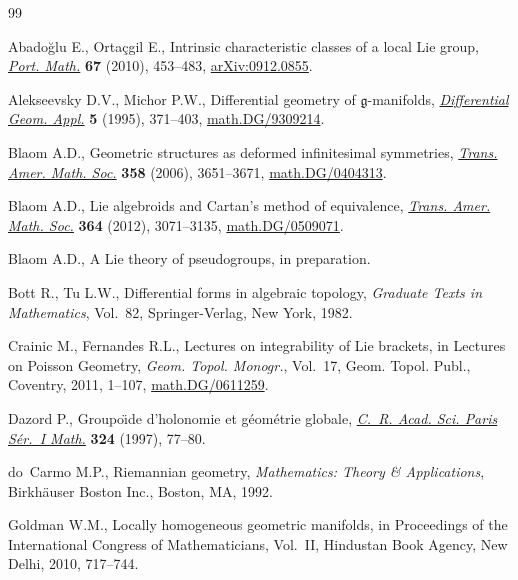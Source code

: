 \documentclass[pdftex]{sigma}
\numberwithin{equation}{section}
\begin{document}
\begin{thebibliography}{99}
\footnotesize\itemsep=-1pt

Abado{\u{g}}lu E., Orta{\c{c}}gil E., Intrinsic characteristic classes of a
  local {L}ie group, \href{http://dx.doi.org/10.4171/PM/1873}{\textit{Port. Math.}} \textbf{67} (2010), 453--483,
  \href{http://arxiv.org/abs/0912.0855}{arXiv:0912.0855}.

Alekseevsky D.V., Michor P.W., Dif\/ferential geometry of {$\mathfrak
  g$}-manifolds, \href{http://dx.doi.org/10.1016/0926-2245(95)00023-2}{\textit{Differential Geom. Appl.}} \textbf{5} (1995), 371--403,
  \href{http://arxiv.org/abs/math.DG/9309214}{math.DG/9309214}.

Blaom A.D., Geometric structures as deformed inf\/initesimal symmetries,
  \href{http://dx.doi.org/10.1090/S0002-9947-06-04057-8}{\textit{Trans. Amer. Math. Soc.}} \textbf{358} (2006), 3651--3671,
  \href{http://arxiv.org/abs/math.DG/0404313}{math.DG/0404313}.

Blaom A.D., Lie algebroids and {C}artan's method of equivalence, \href{http://dx.doi.org/10.1090/S0002-9947-2012-05441-9}{\textit{Trans.
  Amer. Math. Soc.}} \textbf{364} (2012), 3071--3135, \href{http://arxiv.org/abs/math.DG/0509071}{math.DG/0509071}.

Blaom A.D., A Lie theory of pseudogroups, {i}n preparation.

Bott R., Tu L.W., Dif\/ferential forms in algebraic topology, \textit{Graduate
  Texts in Mathematics}, Vol.~82, Springer-Verlag, New York, 1982.

Crainic M., Fernandes R.L., Lectures on integrability of {L}ie brackets, in
  Lectures on {P}oisson Geometry, \textit{Geom. Topol. Monogr.}, Vol.~17, Geom.
  Topol. Publ., Coventry, 2011, 1--107, \href{http://arxiv.org/abs/math.DG/0611259}{math.DG/0611259}.

Dazord P., Groupo\"\i de d'holonomie et g\'eom\'etrie globale, \href{http://dx.doi.org/10.1016/S0764-4442(97)80107-3}{\textit{C.~R.
  Acad. Sci. Paris S\'er.~I Math.}} \textbf{324} (1997), 77--80.

do~Carmo M.P., Riemannian geometry, \textit{Mathematics: Theory {\rm \&} Applications},
  Birkh\"auser Boston Inc., Boston, MA, 1992.

Goldman W.M., Locally homogeneous geometric manifolds, in Proceedings of the
  {I}nternational {C}ongress of {M}athematicians, {V}ol.~{II}, Hindustan Book
  Agency, New Delhi, 2010, 717--744.


\end{thebibliography}
\end{document}
